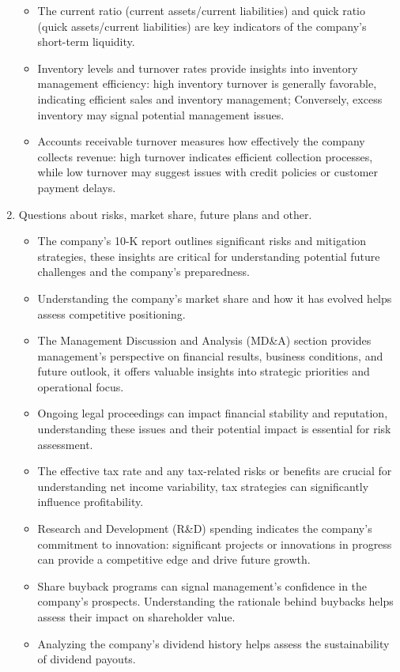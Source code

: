 \begin{enumerate}
\begin{itemize}
    \item The current ratio (current assets/current liabilities) and quick ratio (quick assets/current liabilities) are key indicators of the company’s short-term liquidity.
    \item Inventory levels and turnover rates provide insights into inventory management efficiency: high inventory turnover is generally favorable, indicating efficient sales and inventory management; Conversely, excess inventory may signal potential management issues.
    \item Accounts receivable turnover measures how effectively the company collects revenue: high turnover indicates efficient collection processes, while low turnover may suggest issues with credit policies or customer payment delays.
\end{itemize}
\item Questions about risks, market share, future plans and other. 
\begin{itemize}
    \item The company’s 10-K report outlines significant risks and mitigation strategies, these insights are critical for understanding potential future challenges and the company’s preparedness.
    \item Understanding the company’s market share and how it has evolved helps assess competitive positioning.
    \item The Management Discussion and Analysis (MD\&A) section provides management’s perspective on financial results, business conditions, and future outlook, it offers valuable insights into strategic priorities and operational focus.
    \item Ongoing legal proceedings can impact financial stability and reputation, understanding these issues and their potential impact is essential for risk assessment.
    \item The effective tax rate and any tax-related risks or benefits are crucial for understanding net income variability, tax strategies can significantly influence profitability.
    \item Research and Development (R\&D) spending indicates the company’s commitment to innovation: significant projects or innovations in progress can provide a competitive edge and drive future growth.
    \item Share buyback programs can signal management’s confidence in the company’s prospects. Understanding the rationale behind buybacks helps assess their impact on shareholder value.
    \item Analyzing the company's dividend history helps assess the sustainability of dividend payouts.

\end{itemize}
\end{enumerate}
